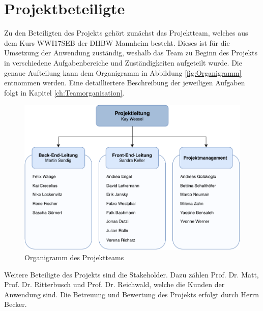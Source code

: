 \section{Projektbeteiligte}
Zu den Beteiligten des Projekts gehört zunächst das Projektteam, welches aus dem Kurs WWI17SEB der DHBW Mannheim besteht.
Dieses ist für die Umsetzung der Anwendung zuständig, weshalb das Team zu Beginn des Projekts in verschiedene Aufgabenbereiche und Zuständigkeiten aufgeteilt wurde.
Die genaue Aufteilung kann dem Organigramm in Abbildung \vref{fig:Organigramm} entnommen werden.
Eine detailliertere Beschreibung der jeweiligen Aufgaben folgt in Kapitel \vref{ch:Teamorganisation}. 

\begin{figure}[h]
	\centering 
	\includegraphics[width=12cm]{img/Organigramm.pdf}
	\captionsetup{format=hang}
	\caption[Organigramm des Projektteams]{\label{fig:Organigramm}Organigramm des Projektteams}
\end{figure}

Weitere Beteiligte des Projekts sind die Stakeholder.
Dazu zählen Prof. Dr. Matt, Prof. Dr. Ritterbusch und Prof. Dr. Reichwald, welche die Kunden der Anwendung sind.
Die Betreuung und Bewertung des Projekts erfolgt durch Herrn Becker.



 
